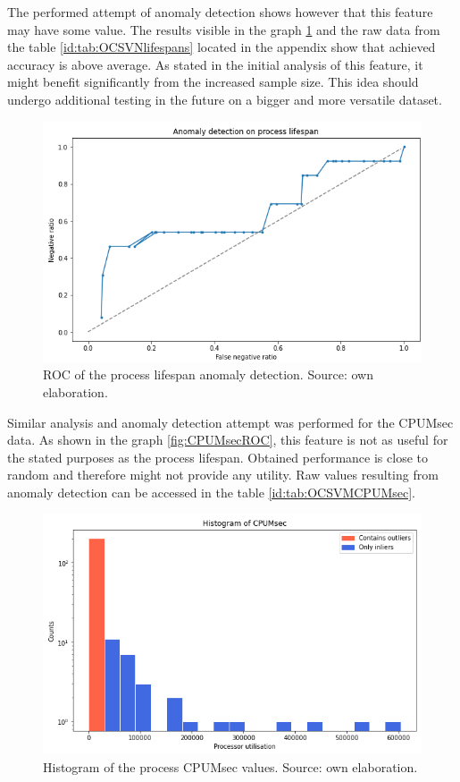 \documentclass[a4paper,twoside,12pt]{book}
\begin{document}
The performed attempt of anomaly detection shows however that this feature may have some value. The results visible in the graph
\ref{fig:lifespanROC} and the raw data from the table \ref{id:tab:OCSVNlifespans} located in the appendix show that achieved accuracy 
is above average. As stated in the initial analysis of this feature, it might benefit significantly from the increased sample size.
This idea should undergo additional testing in the future on a bigger and more versatile dataset.

\begin{figure}
	\centering
	\includegraphics[scale=0.9]{images/ROClifespan}
	\caption{ROC of the process lifespan anomaly detection. Source: own elaboration.}
	\label{fig:lifespanROC}
 \end{figure}

 Similar analysis and anomaly detection attempt was performed for the CPUMsec data. As shown in the graph \ref{fig:CPUMsecROC}, this 
 feature is not as useful for the stated purposes as the process lifespan. Obtained performance is close to random and therefore might
 not provide any utility. Raw values resulting from anomaly detection can be accessed in the table \ref{id:tab:OCSVMCPUMsec}.

 \begin{figure}
	\centering
	\includegraphics[scale=0.9]{images/CPUMsecHist}
	\caption{Histogram of the process CPUMsec values. Source: own elaboration.}
	\label{fig:cpumsecHist}
 \end{figure}
 
\end{document}
